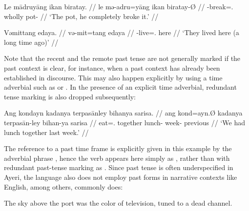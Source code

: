 \a\label{ex:pst}\begingl
	\gla Le mādruyāng ikan biratay. //
	\glb le mə-adru=yāng ikan biratay-Ø //
	\glc \PatTI{} \Pst{}-break=\TsgM{}.\Aarg{} wholly pot-\Top{} //
	\glft `The pot, he completely broke it.' //
\endgl

\a\label{ex:rpst}\begingl
	\gla Vəmittang edaya. //
	\glb və-mit=tang edaya //
	\glc \RPst{}-live=\TplM{}.\Aarg{} here //
	\glft `They lived here (a long time ago)' //
\endgl

\xe

Note that the recent and the remote past tense are not generally marked if the 
past context is clear, for instance, when a past context has already been 
established in discourse. This may also happen explicitly by using a time 
adverbial such as  or . In the presence of an 
explicit time adverbial, redundant tense marking is also dropped subsequently:

\ex\begingl
	\gla Ang kondayn kadanya terpasānley bihanya sarisa. //
	\glb ang kond=ayn.Ø kadanya terpasān-ley bihan-ya sarisa //
	\glc \AgtT{} eat=\Fpl{}.\Top{} together lunch-\PargI{} week-\Loc{}
		previous //
	\glft `We had lunch together last week.' //
\endgl\xe

The reference to a past time frame is explicitly given in this example by the
adverbial phrase , hence the verb
appears here simply as , rather than with redundant
past-tense marking as . Since past tense is often
underspecified in Ayeri, the language also does not employ past forms in
narrative contexts like English, among others, commonly does:

\ex\label{ex:neuromancer}
	The sky above the port was the color of television, tuned to a dead 
	channel. 
\xe

